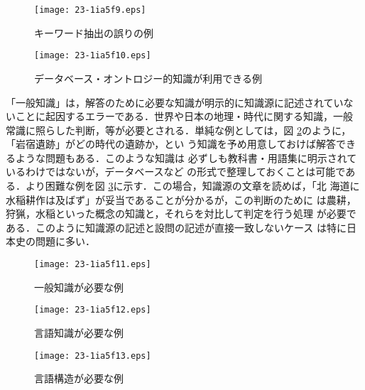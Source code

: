 \documentclass[japanese]{jnlp_1.4b}
\begin{document}
\begin{figure}[b]
\begin{center}
\texttt{[image: 23-1ia5f9.eps]}
\end{center}
\caption{キーワード抽出の誤りの例}
\label{fig:keyword_extraction_error}
\end{figure}
\begin{figure}[b]
\begin{center}
\texttt{[image: 23-1ia5f10.eps]}
\end{center}
\caption{データベース・オントロジー的知識が利用できる例}
\label{fig:ontology_error}
\end{figure}

「一般知識」は，解答のために必要な知識が明示的に知識源に記述されていな
いことに起因するエラーである．世界や日本の地理・時代に関する知識，一般
常識に照らした判断，等が必要とされる．単純な例としては，図
\ref{fig:ontology_error}のように，「岩宿遺跡」がどの時代の遺跡か，とい
う知識を予め用意しておけば解答できるような問題もある．このような知識は
必ずしも教科書・用語集に明示されているわけではないが，データベースなど
の形式で整理しておくことは可能である．より困難な例を図
\ref{fig:knowledge_error}に示す．この場合，知識源の文章を読めば，「北
  海道に水稲耕作は及ばず」が妥当であることが分かるが，この判断のために
は農耕，狩猟，水稲といった概念の知識と，それらを対比して判定を行う処理
が必要である．このように知識源の記述と設問の記述が直接一致しないケース
は特に日本史の問題に多い．

\begin{figure}[b]
\begin{center}
\texttt{[image: 23-1ia5f11.eps]}
\end{center}
\caption{一般知識が必要な例}
\label{fig:knowledge_error}
\end{figure}
\begin{figure}[b]
\begin{center}
\texttt{[image: 23-1ia5f12.eps]}
\end{center}
\caption{言語知識が必要な例}
\label{fig:linguistic_knowledge_error}
\end{figure}
\begin{figure}[b]
\begin{center}
\texttt{[image: 23-1ia5f13.eps]}
\end{center}
\caption{言語構造が必要な例}
\label{fig:linguistic_structure_error}
\end{figure}
\end{document}
